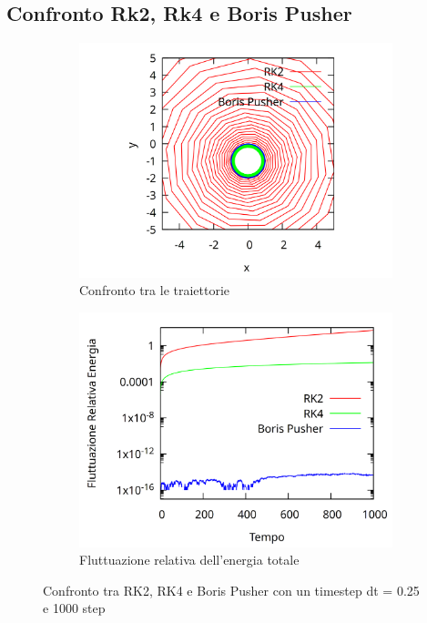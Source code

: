 \subsection{Confronto Rk2, Rk4 e Boris Pusher}
\begin{figure}[ht]
\begin{subfigure}{.5\textwidth}
  \centering
  \includegraphics[width=.9\linewidth]{./img/confronto_traiettorie.png}  
  \caption{Confronto tra le traiettorie }
\end{subfigure}
\begin{subfigure}{.5\textwidth}
  \centering
  \includegraphics[width=.9\linewidth]{./img/erroreE.png}  
  \caption{Fluttuazione relativa dell'energia totale}
\end{subfigure}
\caption{Confronto tra RK2, RK4 e Boris Pusher con un timestep dt = 0.25 e 1000 step}
\end{figure}

